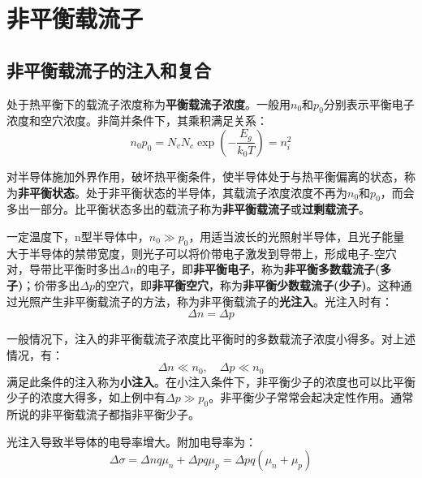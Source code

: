 \chapter{非平衡载流子}

\section{非平衡载流子的注入和复合}

处于热平衡下的载流子浓度称为\textbf{平衡载流子浓度}。一般用$n_0$和$p_0$分别表示平衡电子浓度和空穴浓度。非简并条件下，其乘积满足关系：
\begin{equation}
    n_0p_0=N_vN_c\exp{\left(-\frac{E_g}{k_0T}\right)}=n_i^2
\end{equation}

对半导体施加外界作用，破坏热平衡条件，使半导体处于与热平衡偏离的状态，称为\textbf{非平衡状态}。处于非平衡状态的半导体，其载流子浓度浓度不再为$n_0$和$p_0$，而会多出一部分。比平衡状态多出的载流子称为\textbf{非平衡载流子}或\textbf{过剩载流子}。

一定温度下，n型半导体中，$n_0\gg p_0$，用适当波长的光照射半导体，且光子能量大于半导体的禁带宽度，则光子可以将价带电子激发到导带上，形成电子-空穴对，导带比平衡时多出$\Delta n$的电子，即\textbf{非平衡电子}，称为\textbf{非平衡多数载流子(多子)}；价带多出$\Delta p$的空穴，即\textbf{非平衡空穴}，称为\textbf{非平衡少数载流子(少子)}。这种通过光照产生非平衡载流子的方法，称为非平衡载流子的\textbf{光注入}。光注入时有：
\begin{equation}
    \Delta n=\Delta p
\end{equation}

一般情况下，注入的非平衡载流子浓度比平衡时的多数载流子浓度小得多。对上述情况，有：
\begin{equation}
    \Delta n\ll n_0,\quad \Delta p\ll n_0
\end{equation}
满足此条件的注入称为\textbf{小注入}。在小注入条件下，非平衡少子的浓度也可以比平衡少子的浓度大得多，如上例中有$\Delta p\gg p_0$。非平衡少子常常会起决定性作用。通常所说的非平衡载流子都指非平衡少子。

光注入导致半导体的电导率增大。附加电导率为：
\begin{equation}
    \Delta \sigma=\Delta nq\mu_n+\Delta pq\mu_p=\Delta pq(\mu_n+\mu_p)
\end{equation}


